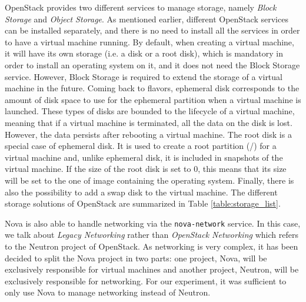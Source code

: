 OpenStack provides two different services to manage storage, namely \textit{Block Storage} and \textit{Object Storage}.
As mentioned earlier, different OpenStack services can be installed separately, and there is no need to install all the services in order to have a virtual machine running.
By default, when creating a virtual machine, it will have its own storage (i.e. a disk or a root disk), which is mandatory in order to install an operating system on it,
and it does not need the Block Storage service. 
However, Block Storage is required to extend the storage of a virtual machine in the future. 
Coming back to flavors, ephemeral disk corresponds to the amount of disk space to use for the ephemeral partition when a virtual machine is launched. 
These types of disks are bounded to the lifecycle of a virtual machine, meaning that if a virtual machine is terminated, all the data on the disk is lost. 
However, the data persists after rebooting a virtual machine.
The root disk is a special case of ephemeral disk. 
It is used to create a root partition (/) for a virtual machine and, unlike ephemeral disk, it is included in snapshots of the virtual machine. 
If the size of the root disk is set to 0, this means that its size will be set to the one of image containing the operating system.
Finally, there is also the possibility to add a swap disk to the virtual machine.
The different storage solutions of OpenStack are summarized in Table \ref{table:storage_list}.

Nova is also able to handle networking via the \texttt{nova-network} service.
In this case, we talk about \textit{Legacy Networking} rather than \textit{OpenStack Networking} which refers to the Neutron project of OpenStack.
As networking is very complex, it has been decided to split the Nova project in two parts: one project, Nova, will be exclusively responsible for virtual machines and another project, Neutron, will be exclusively responsible for networking. 
For our experiment, it was sufficient to only use Nova to manage networking instead of Neutron. 


